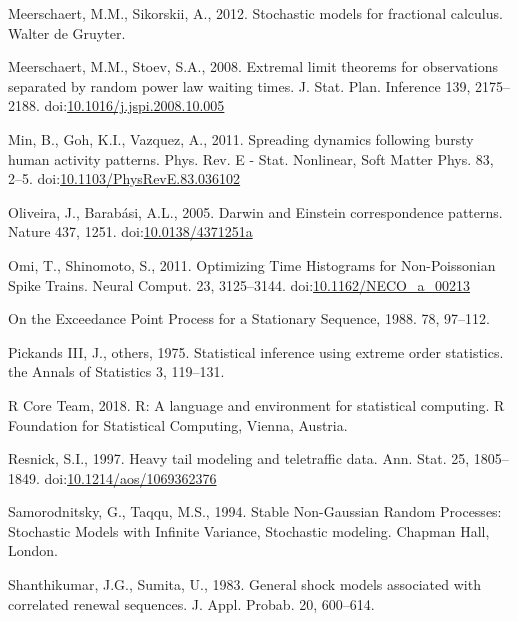 \documentclass[]{elsarticle} %
\begin{document}
\leavevmode\hypertarget{ref-MeerschaertSikorskii}{}%
Meerschaert, M.M., Sikorskii, A., 2012. Stochastic models for fractional
calculus. Walter de Gruyter.

\leavevmode\hypertarget{ref-MeerschaertStoev08}{}%
Meerschaert, M.M., Stoev, S.A., 2008. Extremal limit theorems for
observations separated by random power law waiting times. J. Stat. Plan.
Inference 139, 2175--2188.
doi:\href{https://doi.org/10.1016/j.jspi.2008.10.005}{10.1016/j.jspi.2008.10.005}

\leavevmode\hypertarget{ref-Min2010}{}%
Min, B., Goh, K.I., Vazquez, A., 2011. Spreading dynamics following
bursty human activity patterns. Phys. Rev. E - Stat. Nonlinear, Soft
Matter Phys. 83, 2--5.
doi:\href{https://doi.org/10.1103/PhysRevE.83.036102}{10.1103/PhysRevE.83.036102}

\leavevmode\hypertarget{ref-Oliveira2005}{}%
Oliveira, J., Barabási, A.L., 2005. Darwin and Einstein correspondence
patterns. Nature 437, 1251.
doi:\href{https://doi.org/10.0138/4371251a}{10.0138/4371251a}

\leavevmode\hypertarget{ref-Omi2011}{}%
Omi, T., Shinomoto, S., 2011. Optimizing Time Histograms for
Non-Poissonian Spike Trains. Neural Comput. 23, 3125--3144.
doi:\href{https://doi.org/10.1162/NECO_a_00213}{10.1162/NECO\_a\_00213}

\leavevmode\hypertarget{ref-Hsing88}{}%
On the Exceedance Point Process for a Stationary Sequence, 1988. 78,
97--112.

\leavevmode\hypertarget{ref-pickands1975statistical}{}%
Pickands III, J., others, 1975. Statistical inference using extreme
order statistics. the Annals of Statistics 3, 119--131.

\leavevmode\hypertarget{ref-R}{}%
R Core Team, 2018. R: A language and environment for statistical
computing. R Foundation for Statistical Computing, Vienna, Austria.

\leavevmode\hypertarget{ref-Resnick97}{}%
Resnick, S.I., 1997. Heavy tail modeling and teletraffic data. Ann.
Stat. 25, 1805--1849.
doi:\href{https://doi.org/10.1214/aos/1069362376}{10.1214/aos/1069362376}

\leavevmode\hypertarget{ref-SamorodnitskyTaqqu}{}%
Samorodnitsky, G., Taqqu, M.S., 1994. Stable Non-Gaussian Random
Processes: Stochastic Models with Infinite Variance, Stochastic
modeling. Chapman Hall, London.

\leavevmode\hypertarget{ref-Sumita1983}{}%
Shanthikumar, J.G., Sumita, U., 1983. General shock models associated
with correlated renewal sequences. J. Appl. Probab. 20, 600--614.
\end{document}
